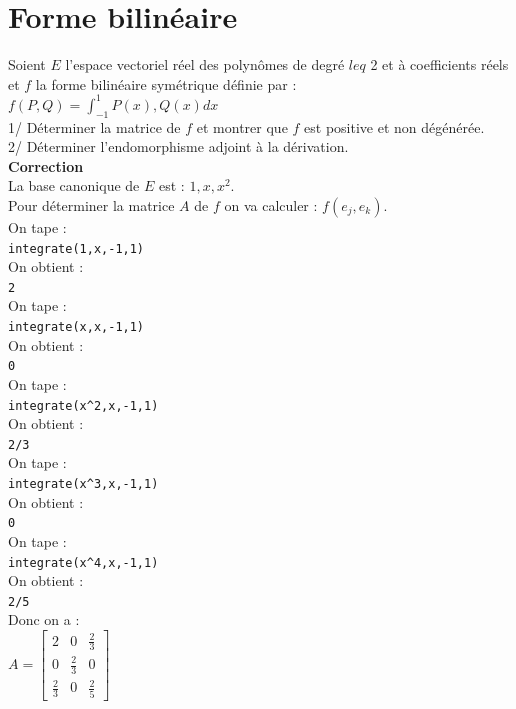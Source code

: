 \documentclass[a4paper,11pt]{book}
\begin{document}
\section{Forme bilin\'eaire}
Soient $E$ l'espace vectoriel r\'eel des polyn\^omes de degr\'e $leq$ 2 et \`a
coefficients r\'eels et $f$ la forme bilin\'eaire sym\'etrique d\'efinie 
par :\\ 
$f(P,Q)=\int_{-1}^1 P(x),Q(x) dx$\\
1/ D\'eterminer la matrice de $f$ et montrer que $f$ est positive et non 
d\'eg\'en\'er\'ee.\\
2/ D\'eterminer l'endomorphisme adjoint \`a la d\'erivation.\\


{\bf Correction}\\
La base canonique de $E$ est : $1,x,x^2$. \\
Pour d\'eterminer la matrice $A$
de $f$ on va calculer : $f(e_j,e_k)$.\\
On tape :\\  
{\tt integrate(1,x,-1,1)}\\
On obtient :\\
{\tt 2}\\
On tape :\\  
{\tt integrate(x,x,-1,1)}\\
On obtient :\\
{\tt 0}\\
On tape :\\  
{\tt integrate(x\verb|^|2,x,-1,1)}\\
On obtient :\\
{\tt 2/3}\\
On tape :\\  
{\tt integrate(x\verb|^|3,x,-1,1)}\\
On obtient :\\
{\tt 0}\\
On tape :\\  
{\tt integrate(x\verb|^|4,x,-1,1)}\\
On obtient :\\
{\tt 2/5}\\

Donc on a :\\
$A=
\left [\begin{array}{rrr}
2&0&\frac{2}{3}\\
0&\frac{2}{3}&0\\
\frac{2}{3}&0&\frac{2}{5} 
\end{array}
\right]$
\end{document}
